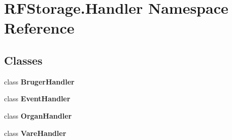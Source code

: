 \section{R\+F\+Storage.\+Handler Namespace Reference}
\label{namespace_r_f_storage_1_1_handler}
\subsection*{Classes}
\begin{DoxyCompactItemize}
\item 
class \textbf{ Bruger\+Handler}
\item 
class \textbf{ Event\+Handler}
\item 
class \textbf{ Organ\+Handler}
\item 
class \textbf{ Vare\+Handler}
\end{DoxyCompactItemize}
